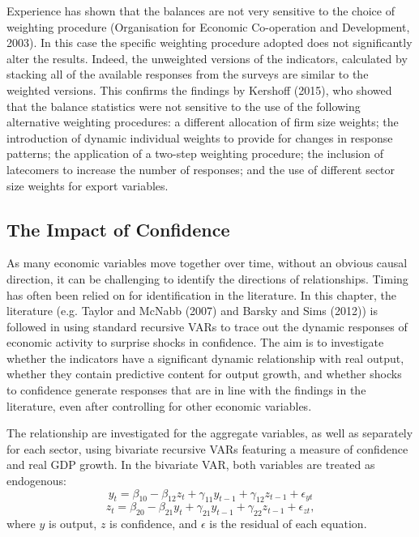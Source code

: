 \documentclass[11pt,]{article}
\begin{document}
Experience has shown that the balances are not very sensitive to the
choice of weighting procedure (Organisation for Economic Co-operation
and Development, 2003). In this case the specific weighting procedure
adopted does not significantly alter the results. Indeed, the unweighted
versions of the indicators, calculated by stacking all of the available
responses from the surveys are similar to the weighted versions. This
confirms the findings by Kershoff (2015), who showed that the balance
statistics were not sensitive to the use of the following alternative
weighting procedures: a different allocation of firm size weights; the
introduction of dynamic individual weights to provide for changes in
response patterns; the application of a two-step weighting procedure;
the inclusion of latecomers to increase the number of responses; and the
use of different sector size weights for export variables.

\subsection{The Impact of Confidence}\label{the-impact-of-confidence-1}

As many economic variables move together over time, without an obvious
causal direction, it can be challenging to identify the directions of
relationships. Timing has often been relied on for identification in the
literature. In this chapter, the literature (e.g. Taylor and McNabb
(2007) and Barsky and Sims (2012)) is followed in using standard
recursive VARs to trace out the dynamic responses of economic activity
to surprise shocks in confidence. The aim is to investigate whether the
indicators have a significant dynamic relationship with real output,
whether they contain predictive content for output growth, and whether
shocks to confidence generate responses that are in line with the
findings in the literature, even after controlling for other economic
variables.

The relationship are investigated for the aggregate variables, as well
as separately for each sector, using bivariate recursive VARs featuring
a measure of confidence and real GDP growth. In the bivariate VAR, both
variables are treated as endogenous:
\[y_t = \beta_{10} - \beta_{12} z_t + \gamma_{11} y_{t-1} + \gamma_{12} z_{t-1} + \epsilon_{yt}\]
\[z_t = \beta_{20} - \beta_{21} y_t + \gamma_{21} y_{t-1} + \gamma_{22} z_{t-1} + \epsilon_{zt} ,\]
where \(y\) is output, \(z\) is confidence, and \(\epsilon\) is the
residual of each equation.
\end{document}
